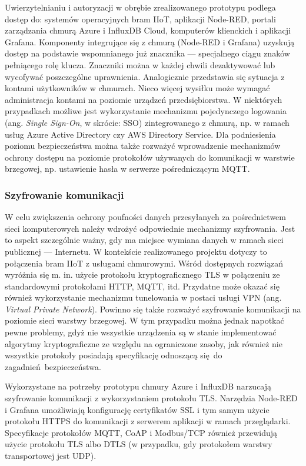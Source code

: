 \documentclass[a4paper, 12pt, twoside]{article}
\begin{document}
Uwierzytelnianiu i autoryzacji w obrębie zrealizowanego prototypu podlega dostęp do: systemów operacyjnych
bram IIoT, aplikacji Node-RED, portali zarządzania chmurą Azure i InfluxDB Cloud,
komputerów klienckich i aplikacji Grafana. Komponenty integrujące się z chmurą
(Node-RED i Grafana) uzyskują dostęp na podstawie wspomnianego już znacznika ---
specjalnego ciągu znaków pełniącego rolę klucza. Znaczniki można w każdej
chwili dezaktywować lub wycofywać poszczególne uprawnienia. Analogicznie przedstawia się
sytuacja z kontami użytkowników w chmurach. Nieco więcej wysiłku może wymagać
administracja kontami na poziomie urządzeń przedsiębiorstwa. W niektórych
przypadkach możliwe jest wykorzystanie mechanizmu pojedynczego logowania
(ang. \emph{Single Sign-On}, w skrócie: SSO) zintegrowanego z chmurą, np.
w ramach usług Azure Active Directory czy AWS Directory Service.
Dla podniesienia poziomu bezpieczeństwa można także rozważyć wprowadzenie
mechanizmów ochrony dostępu na poziomie protokołów używanych do komunikacji
w warstwie brzegowej, np. ustawienie hasła w serwerze pośredniczącym MQTT.

\subsubsection{Szyfrowanie komunikacji}

W celu zwiększenia ochrony poufności danych przesyłanych za pośrednictwem sieci
komputerowych należy wdrożyć odpowiednie mechanizmy szyfrowania. Jest to aspekt
szczególnie ważny, gdy ma miejsce wymiana danych w ramach sieci publicznej --- Internetu.
W kontekście realizowanego projektu dotyczy to połączenia bram IIoT z usługami chmurowymi.
Wśród dostępnych rozwiązań wyróżnia się m. in. użycie protokołu kryptograficznego TLS w połączeniu
ze standardowymi protokołami HTTP, MQTT, itd. Przydatne może okazać się również
wykorzystanie mechanizmu tunelowania w postaci usługi VPN (ang. \emph{Virtual Private Network}).
Powinno się także rozważyć szyfrowanie komunikacji na poziomie sieci warstwy brzegowej.
W tym przypadku można jednak napotkać pewne problemy, gdyż nie wszystkie urządzenia
są w stanie implementować algorytmy kryptograficzne ze względu
na ograniczone zasoby, jak również nie wszystkie protokoły posiadają specyfikację
odnoszącą się do zagadnień bezpieczeństwa.

Wykorzystane na potrzeby prototypu chmury Azure i InfluxDB narzucają szyfrowanie
komunikacji z wykorzystaniem protokołu TLS. Narzędzia Node-RED i Grafana
umożliwiają konfigurację certyfikatów SSL i tym samym użycie protokołu
HTTPS do komunikacji z serwerem aplikacji w ramach przeglądarki. Specyfikacje
protokołów MQTT, CoAP i Modbus/TCP również przewidują użycie protokołu TLS albo
DTLS (w przypadku, gdy protokołem warstwy transportowej jest UDP).
\end{document}
